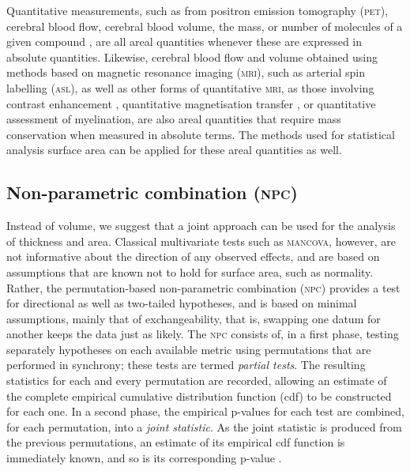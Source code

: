Quantitative measurements, such as from positron emission tomography (\textsc{pet}), cerebral blood flow, cerebral blood volume, the mass, or number of molecules of a given compound \citep{Leahy2000, VandenHoff2005}, are all areal quantities whenever these are expressed in absolute quantities. Likewise, cerebral blood flow and volume obtained using methods based on magnetic resonance imaging (\textsc{mri}), such as arterial spin labelling (\textsc{asl}), as well as other forms of quantitative \textsc{mri}, as those involving contrast enhancement \citep{Parker2003}, quantitative magnetisation transfer \citep{Levesque2010, Harrison2015}, or quantitative assessment of myelination, are also areal quantities that require mass conservation when measured in absolute terms. The methods used for statistical analysis surface area can be applied for these areal quantities as well.

\subsection{Non-parametric combination (\textsc{npc})}

Instead of volume, we suggest that a joint approach can be used for the analysis of thickness and area. Classical multivariate tests such as \textsc{mancova}, however, are not informative about the direction of any observed effects, and are based on assumptions that are known not to hold for surface area, such as normality. Rather, the permutation-based non-parametric combination (\textsc{npc}) \citep{Pesarin2010, Winkler2016_npc} provides a test for directional as well as two-tailed hypotheses, and is based on minimal assumptions, mainly that of exchangeability, that is, swapping one datum for another keeps the data just as likely. The \textsc{npc} consists of, in a first phase, testing separately hypotheses on each available metric using permutations that are performed in synchrony; these tests are termed \emph{partial tests}. The resulting statistics for each and every permutation are recorded, allowing an estimate of the complete empirical cumulative distribution function (cdf) to be constructed for each one. In a second phase, the empirical p-values for each test are combined, for each permutation, into a \emph{joint statistic}. As the joint statistic is produced from the previous permutations, an estimate of its empirical cdf function is immediately known, and so is its corresponding p-value \citep{Pesarin2010}.

